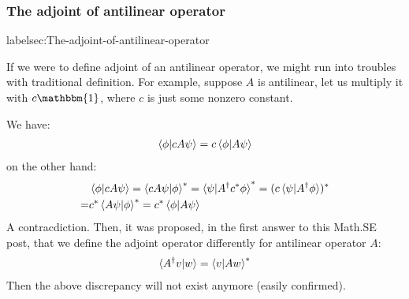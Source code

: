 \documentclass{article}
\numberwithin{equation}{subsection} %
\theoremstyle{definition}
\begin{document}
    \subsubsection{The adjoint of antilinear operator}
    label{sec:The-adjoint-of-antilinear-operator}
    
    If we were to define adjoint of an antilinear operator, we might
    run into troubles with traditional definition. For example, suppose
    $A$ is antilinear, let us multiply it with $c\mathbbm{1}$, where $c$
    is just some nonzero constant.

    We have:
    \begin{align}
        \braket{\phi|cA \psi} = c\braket{\phi|A\psi}
    \end{align}
    on the other hand:
    \begin{align}
        &\braket{\phi|cA \psi} = \braket{cA\psi|\phi}^*
            = \braket{\psi|A^\dagger c^* \phi}^* 
            =(c\braket{\psi|A^\dagger \phi})^* \nonumber\\
            =& c^* \braket{A\psi|\phi}^* 
            = c^* \braket{\phi|A\psi}
    \end{align}
    A contracdiction. Then, it was proposed, in the first answer to
    this Math.SE post\cite{math.SE-adjoint-of-antilinear}, that we define
    the adjoint operator differently for antilinear operator $A$:
    \begin{align}
        \braket{A^\dagger v|w} = \braket{v| Aw}^*
    \end{align}
    Then the above discrepancy will not exist anymore (easily confirmed).
\end{document}

